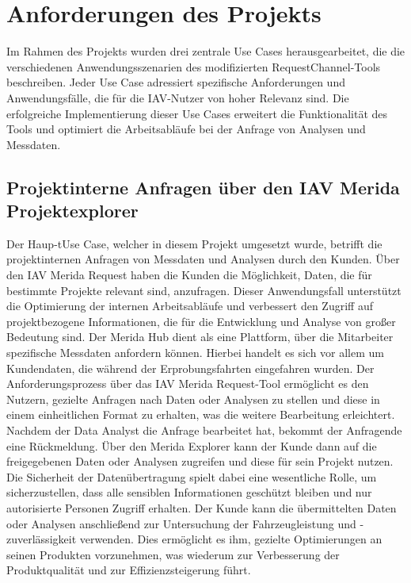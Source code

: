 \chapter{Anforderungen des Projekts}

Im Rahmen des Projekts wurden drei zentrale Use Cases herausgearbeitet, die die verschiedenen Anwendungsszenarien des modifizierten RequestChannel-Tools beschreiben. Jeder Use Case adressiert spezifische Anforderungen und Anwendungsfälle, die für die IAV-Nutzer von hoher Relevanz sind. Die erfolgreiche Implementierung dieser Use Cases erweitert die Funktionalität des Tools und optimiert die Arbeitsabläufe bei der Anfrage von Analysen und Messdaten.
\section{Projektinterne Anfragen über den IAV Merida Projektexplorer}
Der Haup-tUse Case, welcher in diesem Projekt umgesetzt wurde, betrifft die projektinternen Anfragen von Messdaten und Analysen durch den Kunden. Über den IAV Merida Request haben die Kunden die Möglichkeit, Daten, die für bestimmte Projekte relevant sind, anzufragen. Dieser Anwendungsfall unterstützt die Optimierung der internen Arbeitsabläufe und verbessert den Zugriff auf projektbezogene Informationen, die für die Entwicklung und Analyse von großer Bedeutung sind.
\newline
Der Merida Hub dient als eine Plattform, über die Mitarbeiter spezifische Messdaten anfordern können. Hierbei handelt es sich vor allem um Kundendaten, die während der Erprobungsfahrten eingefahren wurden. Der Anforderungsprozess über das IAV Merida Request-Tool ermöglicht es den Nutzern, gezielte Anfragen nach Daten oder Analysen zu stellen und diese in einem einheitlichen Format zu erhalten, was die weitere Bearbeitung erleichtert.
\newline
Nachdem der Data Analyst die Anfrage bearbeitet hat, bekommt der Anfragende eine Rückmeldung. Über den Merida Explorer kann der Kunde dann auf die freigegebenen Daten oder Analysen zugreifen und diese für sein Projekt nutzen. Die Sicherheit der Datenübertragung spielt dabei eine wesentliche Rolle, um sicherzustellen, dass alle sensiblen Informationen geschützt bleiben und nur autorisierte Personen Zugriff erhalten.
\newline
Der Kunde kann die übermittelten Daten oder Analysen anschließend zur Untersuchung der Fahrzeugleistung und -zuverlässigkeit verwenden. Dies ermöglicht es ihm, gezielte Optimierungen an seinen Produkten vorzunehmen, was wiederum zur Verbesserung der Produktqualität und zur Effizienzsteigerung führt.
